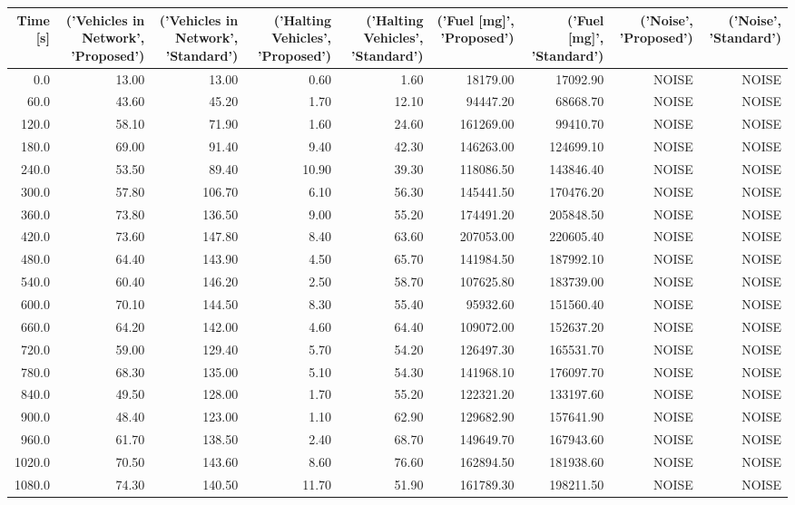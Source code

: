 \begin{tabular}{r|rr|rr|rr|rr}
\toprule
Time [s] & ('Vehicles in Network', 'Proposed') & ('Vehicles in Network', 'Standard') & ('Halting Vehicles', 'Proposed') & ('Halting Vehicles', 'Standard') & ('Fuel [mg]', 'Proposed') & ('Fuel [mg]', 'Standard') & ('Noise', 'Proposed') & ('Noise', 'Standard') \\
\midrule
0.0 & 13.00 & 13.00 & 0.60 & 1.60 & 18179.00 & 17092.90 & NOISE & NOISE \\
60.0 & 43.60 & 45.20 & 1.70 & 12.10 & 94447.20 & 68668.70 & NOISE & NOISE \\
120.0 & 58.10 & 71.90 & 1.60 & 24.60 & 161269.00 & 99410.70 & NOISE & NOISE \\
180.0 & 69.00 & 91.40 & 9.40 & 42.30 & 146263.00 & 124699.10 & NOISE & NOISE \\
240.0 & 53.50 & 89.40 & 10.90 & 39.30 & 118086.50 & 143846.40 & NOISE & NOISE \\
300.0 & 57.80 & 106.70 & 6.10 & 56.30 & 145441.50 & 170476.20 & NOISE & NOISE \\
360.0 & 73.80 & 136.50 & 9.00 & 55.20 & 174491.20 & 205848.50 & NOISE & NOISE \\
420.0 & 73.60 & 147.80 & 8.40 & 63.60 & 207053.00 & 220605.40 & NOISE & NOISE \\
480.0 & 64.40 & 143.90 & 4.50 & 65.70 & 141984.50 & 187992.10 & NOISE & NOISE \\
540.0 & 60.40 & 146.20 & 2.50 & 58.70 & 107625.80 & 183739.00 & NOISE & NOISE \\
600.0 & 70.10 & 144.50 & 8.30 & 55.40 & 95932.60 & 151560.40 & NOISE & NOISE \\
660.0 & 64.20 & 142.00 & 4.60 & 64.40 & 109072.00 & 152637.20 & NOISE & NOISE \\
720.0 & 59.00 & 129.40 & 5.70 & 54.20 & 126497.30 & 165531.70 & NOISE & NOISE \\
780.0 & 68.30 & 135.00 & 5.10 & 54.30 & 141968.10 & 176097.70 & NOISE & NOISE \\
840.0 & 49.50 & 128.00 & 1.70 & 55.20 & 122321.20 & 133197.60 & NOISE & NOISE \\
900.0 & 48.40 & 123.00 & 1.10 & 62.90 & 129682.90 & 157641.90 & NOISE & NOISE \\
960.0 & 61.70 & 138.50 & 2.40 & 68.70 & 149649.70 & 167943.60 & NOISE & NOISE \\
1020.0 & 70.50 & 143.60 & 8.60 & 76.60 & 162894.50 & 181938.60 & NOISE & NOISE \\
1080.0 & 74.30 & 140.50 & 11.70 & 51.90 & 161789.30 & 198211.50 & NOISE & NOISE \\

\end{tabular}
